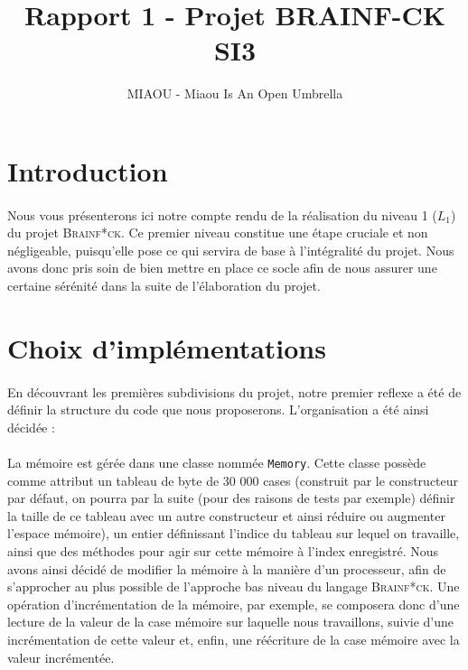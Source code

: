 \documentclass[a4paper]{article}
\title{Rapport 1 - Projet BRAINF-CK SI3}
\author{MIAOU - Miaou Is An Open Umbrella}
\begin{document}
\maketitle{}

\section{Introduction}
\paragraph{}Nous vous présenterons ici notre compte rendu de la réalisation du niveau 1 ($L_1$) du projet \textsc{Brainf*ck}. Ce premier niveau constitue une étape cruciale et non négligeable, puisqu'elle pose ce qui servira de base à l'intégralité du projet. Nous avons donc pris soin de bien mettre en place ce socle afin de nous assurer une certaine sérénité dans la suite de l'élaboration du projet.

\section{Choix d'implémentations}
\paragraph{}En découvrant les premières subdivisions du projet, notre premier reflexe a été de définir la structure du code que nous proposerons. L'organisation a été ainsi décidée :
\paragraph{}La mémoire est gérée dans une classe nommée \texttt{Memory}.
Cette classe possède comme attribut un tableau de byte de 30 000 cases (construit par le constructeur par défaut, on pourra par la suite (pour des raisons de tests par exemple) définir la taille de ce tableau avec un autre constructeur et ainsi réduire ou augmenter l'espace mémoire), un entier définissant l'indice du tableau sur lequel on travaille, ainsi que des méthodes pour agir sur cette mémoire à l'index enregistré. Nous avons ainsi décidé de modifier la mémoire à la manière d'un processeur, afin de s'approcher au plus possible de l'approche bas niveau du langage \textsc{Brainf*ck}. Une opération d'incrémentation de la mémoire, par exemple, se composera donc d'une lecture de la valeur de la case mémoire sur laquelle nous travaillons, suivie d'une incrémentation de cette valeur et, enfin, une réécriture de la case mémoire avec la valeur incrémentée.
\end{document}
